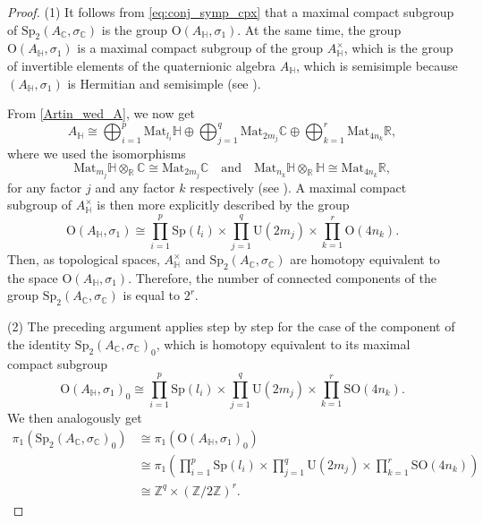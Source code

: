 \documentclass[oneside,11pt]{amsart}
\theoremstyle{definition}
\theoremstyle{remark}
\numberwithin{thm}{section}
\numberwithin{equation}{section}
\begin{document}
\begin{proof}
(1) It follows from \eqref{eq:conj_symp_cpx} that a maximal compact subgroup of $\mathrm{Sp}_2(A_\mathbb{C}, \sigma_{\mathbb{C}})$ is the group $\mathrm{O}(A_{\mathbb{H}}, \sigma_1)$. At the same time, the group $\mathrm{O}(A_{\mathbb{H}}, \sigma_1)$ is a maximal compact subgroup of the group $A^{\times}_{\mathbb{H}}$, which is the group of invertible elements of the quaternionic algebra $A_{\mathbb{H}}$, which is semisimple because $(A_{\mathbb{H}},\sigma_1)$ is Hermitian and semisimple (see \cite[Corollary 2.93]{ABRRW}).

\noindent From \eqref{Artin_wed_A}, we now get
\[A_{\mathbb{H}} \cong \bigoplus_{i=1}^p \mathrm{Mat}_{l_i}\mathbb{H} \oplus \bigoplus_{j=1}^q \mathrm{Mat}_{2m_j}\mathbb{C} \oplus \bigoplus_{k=1}^r \mathrm{Mat}_{4n_k}\mathbb{R},\]
where we used the isomorphisms 
\[\mathrm{Mat}_{m_j}\mathbb{H}\otimes_{\mathbb{R}}\mathbb{C} \cong \mathrm{Mat}_{2m_j}\mathbb{C} \quad \text{and} \quad 
\mathrm{Mat}_{n_k}\mathbb{H}\otimes_{\mathbb{R}}\mathbb{H} \cong \mathrm{Mat}_{4n_k}\mathbb{R},\] for any factor $j$ and any factor $k$ respectively 
(see \cite[Appendix B.1]{ABRRW}).
A maximal compact subgroup of $A_{\mathbb{H}}^{\times}$ is then more explicitly described by the  group 
\[\mathrm{O}(A_{\mathbb{H}}, \sigma_1) \cong \prod_{i=1}^p \mathrm{Sp}(l_i) \times \prod_{j=1}^q \mathrm{U}(2m_j) \times\prod_{k=1}^r \mathrm{O}(4n_k).\]
Then, as topological spaces, $A_{\mathbb{H}}^{\times}$ and $\mathrm{Sp}_2(A_\mathbb{C}, \sigma_{\mathbb{C}})$ are homotopy equivalent to the space $\mathrm{O}(A_{\mathbb{H}}, \sigma_1)$. Therefore, the number of connected components of the group $\mathrm{Sp}_2(A_\mathbb{C}, \sigma_{\mathbb{C}})$ is equal to $2^r$.

(2) The preceding argument applies step by step for the case of the component of the identity $\mathrm{Sp}_2(A_\mathbb{C}, \sigma_{\mathbb{C}})_0$, which is homotopy equivalent to its maximal compact subgroup \[\mathrm{O}(A_{\mathbb{H}}, \sigma_1)_0 \cong \prod_{i=1}^p \mathrm{Sp}(l_i) \times \prod_{j=1}^q \mathrm{U}(2m_j) \times\prod_{k=1}^r \mathrm{SO}(4n_k).\]  
We then analogously get 
\begin{align*}
\pi_1\left( \mathrm{Sp}_2(A_\mathbb{C}, \sigma_{\mathbb{C}})_0\right) & \cong \pi_1\left(\mathrm{O}(A_{\mathbb{H}}, \sigma_1)_0\right)\\
& \cong \pi_1\left( \prod_{i=1}^p \mathrm{Sp}(l_i) \times \prod_{j=1}^q \mathrm{U}(2m_j) \times\prod_{k=1}^r \mathrm{SO}(4n_k)\right)\\
& \cong \mathbb{Z}^q \times (\mathbb{Z}/2\mathbb{Z})^r.
\end{align*}


\end{proof}
\end{document}
